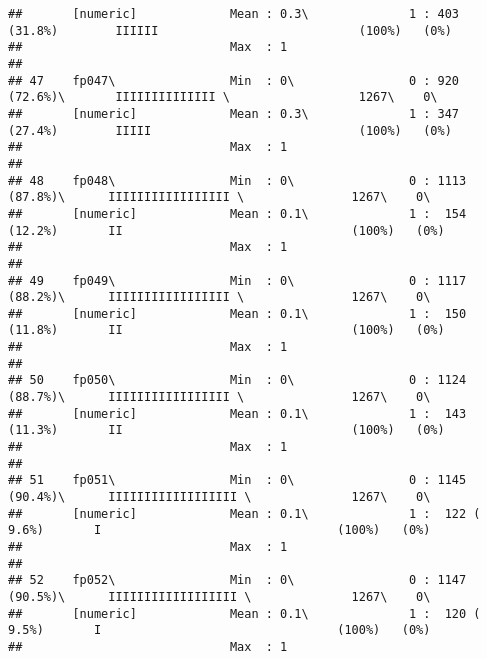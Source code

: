 \documentclass[]{article}
\begin{document}
\begin{verbatim}
##       [numeric]             Mean : 0.3\              1 : 403 (31.8%)        IIIIII                            (100%)   (0%)     
##                             Max  : 1                                                                                            
## 
## 47    fp047\                Min  : 0\                0 : 920 (72.6%)\       IIIIIIIIIIIIII \                  1267\    0\       
##       [numeric]             Mean : 0.3\              1 : 347 (27.4%)        IIIII                             (100%)   (0%)     
##                             Max  : 1                                                                                            
## 
## 48    fp048\                Min  : 0\                0 : 1113 (87.8%)\      IIIIIIIIIIIIIIIII \               1267\    0\       
##       [numeric]             Mean : 0.1\              1 :  154 (12.2%)       II                                (100%)   (0%)     
##                             Max  : 1                                                                                            
## 
## 49    fp049\                Min  : 0\                0 : 1117 (88.2%)\      IIIIIIIIIIIIIIIII \               1267\    0\       
##       [numeric]             Mean : 0.1\              1 :  150 (11.8%)       II                                (100%)   (0%)     
##                             Max  : 1                                                                                            
## 
## 50    fp050\                Min  : 0\                0 : 1124 (88.7%)\      IIIIIIIIIIIIIIIII \               1267\    0\       
##       [numeric]             Mean : 0.1\              1 :  143 (11.3%)       II                                (100%)   (0%)     
##                             Max  : 1                                                                                            
## 
## 51    fp051\                Min  : 0\                0 : 1145 (90.4%)\      IIIIIIIIIIIIIIIIII \              1267\    0\       
##       [numeric]             Mean : 0.1\              1 :  122 ( 9.6%)       I                                 (100%)   (0%)     
##                             Max  : 1                                                                                            
## 
## 52    fp052\                Min  : 0\                0 : 1147 (90.5%)\      IIIIIIIIIIIIIIIIII \              1267\    0\       
##       [numeric]             Mean : 0.1\              1 :  120 ( 9.5%)       I                                 (100%)   (0%)     
##                             Max  : 1                                                                                            

\end{verbatim}
\end{document}
